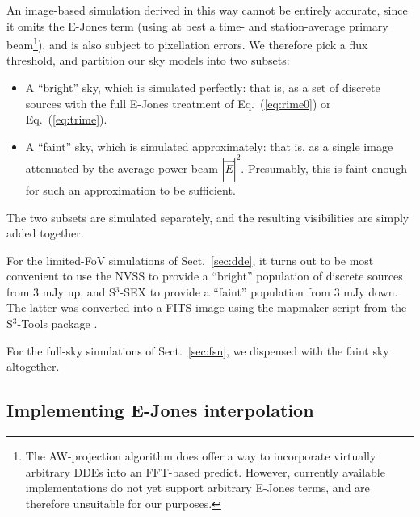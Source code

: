 \documentclass{aa}
\begin{document}
An image-based simulation derived in this way cannot be entirely accurate, since it omits the E-Jones term (using at best a time- and station-average primary beam\footnote{The AW-projection algorithm \citep{SB:imageplane} does offer a way to incorporate virtually arbitrary DDEs into an FFT-based predict. However, currently available implementations do not yet support arbitrary E-Jones terms, and are therefore unsuitable for our purposes.}), and is also subject to pixellation errors. We therefore pick a flux threshold, and partition our sky models into two subsets:

\begin{itemize}
  \item A ``bright'' sky, which is simulated perfectly: that is, as a set of discrete sources with the full E-Jones treatment of Eq.~(\ref{eq:rime0}) or Eq.~(\ref{eq:trime}).
  \item A ``faint'' sky, which is simulated approximately: that is, as a single image attenuated by the average power beam $|\vec E|^2$. Presumably, this is faint enough for such an approximation to be sufficient.
\end{itemize}

The two subsets are simulated separately, and the resulting visibilities are simply added together.

For the limited-FoV simulations of Sect.~\ref{sec:dde}, it turns out to be most convenient to use the NVSS to provide a ``bright'' population of discrete sources from 3 mJy up, and S$^3$-SEX to provide a ``faint'' population from 3 mJy down. The latter was converted into a FITS image using the mapmaker script from the S$^3$-Tools package \citep{S3-SEX}. 

For the full-sky simulations of Sect.~\ref{sec:fsn}, we dispensed with the faint sky altogether.

\subsection{Implementing E-Jones interpolation}
\end{document}
